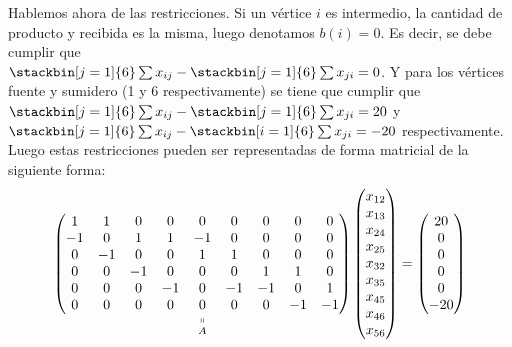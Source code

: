 \begin{ejem}
Hablemos ahora de las restricciones. Si un vértice $i$ es intermedio, la cantidad de producto y recibida es la misma, luego denotamos $b(i)=0$. Es decir, se debe cumplir que\\
$\stackbin[j=1]{6}\sum x_{ij}-\stackbin[j=1]{6}\sum x_{ji}=0$. Y para los vértices fuente y sumidero (1 y 6 respectivamente) se tiene que cumplir que $\stackbin[j=1]{6}\sum x_{ij}-\stackbin[j=1]{6}\sum x_{ji}=20$ y $\stackbin[j=1]{6}\sum x_{ij}-\stackbin[i=1]{6}\sum x_{ji}=-20$ respectivamente. Luego estas restricciones pueden ser representadas de forma matricial de la siguiente forma:
\[\underset{A}{\underset{\shortparallel}{\begin{pmatrix}
1&1&0&0&0&0&0&0&0\\
-1&0&1&1&-1&0&0&0&0\\
0&-1&0&0&1&1&0&0&0\\
0&0&-1&0&0&0&1&1&0\\
0&0&0&-1&0&-1&-1&0&1\\
0&0&0&0&0&0&0&-1&-1
\end{pmatrix}}}\begin{pmatrix}x_{12}\\x_{13}\\x_{24}\\x_{25}\\x_{32}\\x_{35}\\x_{45}\\x_{46}\\x_{56}\end{pmatrix}=\begin{pmatrix}20\\0\\0\\0\\0\\-20\end{pmatrix}\]
\end{ejem}

